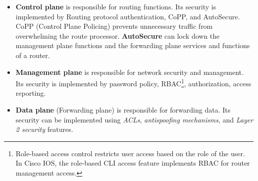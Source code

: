 \begin{itemize}

\item\textbf{Control plane} is responsible for routing functions. Its security is implemented by Routing protocol authentication, CoPP, and AutoSecure. CoPP (Control Plane Policing) prevents unnecessary traffic from overwhelming the route processor. \textbf{AutoSecure} can lock down the management plane functions and the forwarding plane services and functions of a router.\\

\item\textbf{Management plane} is responsible for network security and management. Its security is implemented by password policy, RBAC\footnote{Role-based access control  restricts user access based on the role of the user. In Cisco IOS, the role-based CLI access feature implements RBAC for router management access.}, authorization, access reporting.

\item\textbf{Data plane} (Forwarding plane) is responsible for forwarding data. Its security can be implemented using \emph{ACLs}, \emph{antispoofing mechanisms}, and \emph{Layer 2 security} features. 

\end{itemize}